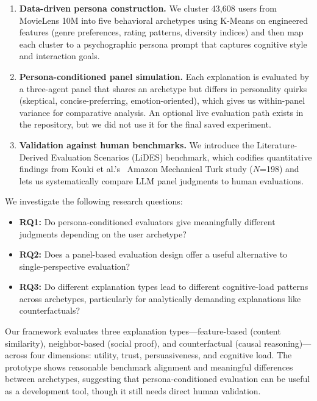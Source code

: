 \documentclass[sigconf,nonacm]{acmart}
\begin{document}
\begin{enumerate}[leftmargin=*]
\item \textbf{Data-driven persona construction.} We cluster 43,608 users from MovieLens 10M into five behavioral archetypes using K-Means on engineered features (genre preferences, rating patterns, diversity indices) and then map each cluster to a psychographic persona prompt that captures cognitive style and interaction goals.

\item \textbf{Persona-conditioned panel simulation.} Each explanation is evaluated by a three-agent panel that shares an archetype but differs in personality quirks (skeptical, concise-preferring, emotion-oriented), which gives us within-panel variance for comparative analysis. An optional live evaluation path exists in the repository, but we did not use it for the final saved experiment.

\item \textbf{Validation against human benchmarks.} We introduce the Literature-Derived Evaluation Scenarios (LiDES) benchmark, which codifies quantitative findings from Kouki et al.'s~\cite{kouki2019} Amazon Mechanical Turk study ($N$=198) and lets us systematically compare LLM panel judgments to human evaluations.
\end{enumerate}

We investigate the following research questions:

\begin{itemize}[leftmargin=*]
\item \textbf{RQ1:} Do persona-conditioned evaluators give meaningfully different judgments depending on the user archetype?
\item \textbf{RQ2:} Does a panel-based evaluation design offer a useful alternative to single-perspective evaluation?
\item \textbf{RQ3:} Do different explanation types lead to different cognitive-load patterns across archetypes, particularly for analytically demanding explanations like counterfactuals?
\end{itemize}

Our framework evaluates three explanation types---feature-based (content similarity), neighbor-based (social proof), and counterfactual (causal reasoning)---across four dimensions: utility, trust, persuasiveness, and cognitive load. The prototype shows reasonable benchmark alignment and meaningful differences between archetypes, suggesting that persona-conditioned evaluation can be useful as a development tool, though it still needs direct human validation.
\end{document}
